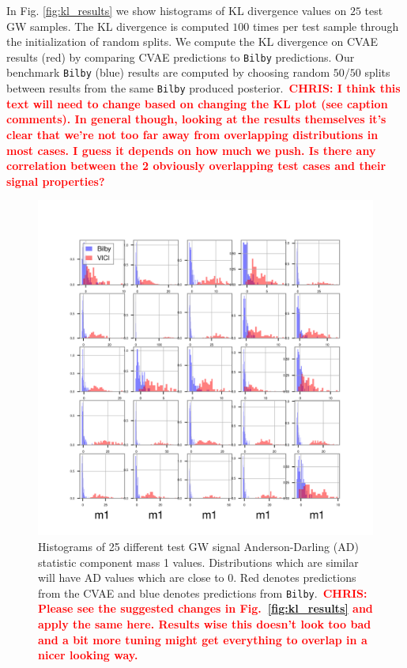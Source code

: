 \documentclass[%
showpacs,
 amsmath,amssymb,
 aps,
 twocolumn,
 prl,
 reprint,
floatfix,
]{revtex4-1}
\newcommand{\chris}[1]{\textbf{\textcolor{red}{CHRIS: #1}}}
\begin{document}
In Fig. \ref{fig:kl_results} we show histograms of KL divergence values on $25$
test GW samples. The KL divergence is computed $100$ times per test sample
through the initialization of random splits. We compute the KL divergence on
\ac{CVAE} results (red) by comparing \ac{CVAE} predictions to \texttt{Bilby}
predictions. Our benchmark \texttt{Bilby} (blue) results are computed by
choosing random $50/50$ splits between results from the same \texttt{Bilby}
produced posterior.~\chris{I think this text will need to change based on
changing the KL plot (see caption comments). In general though, looking at the
results themselves it's clear that we're not too far away from overlapping
distributions in most cases. I guess it depends on how much we push. Is there
any correlation between the 2 obviously overlapping test cases and their signal
properties?}


%
%
\begin{figure}
    \includegraphics[width=\columnwidth]{images/hist-ad_0.png}
    \caption{\label{fig:ad_results} Histograms of 25 different test GW signal
Anderson-Darling (AD) statistic component mass 1 values. Distributions which
are similar will have AD values which are close to 0.  Red denotes predictions
from the \ac{CVAE} and blue denotes predictions from
\texttt{Bilby}.~\chris{Please see the suggested changes in
Fig.~\ref{fig:kl_results} and apply the same here. Results wise this doesn't
look too bad and a bit more tuning might get everything to overlap in a nicer
looking way.}}
\end{figure}
\end{document}
